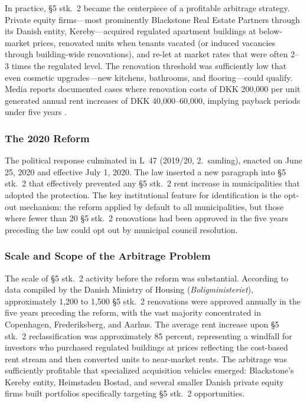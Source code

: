 \documentclass[12pt]{article}
\begin{document}
In practice, \S5 stk.\ 2 became the centerpiece of a profitable arbitrage strategy. Private equity firms---most prominently Blackstone Real Estate Partners through its Danish entity, Kereby---acquired regulated apartment buildings at below-market prices, renovated units when tenants vacated (or induced vacancies through building-wide renovations), and re-let at market rates that were often 2--3 times the regulated level. The renovation threshold was sufficiently low that even cosmetic upgrades---new kitchens, bathrooms, and flooring---could qualify. Media reports documented cases where renovation costs of DKK 200,000 per unit generated annual rent increases of DKK 40,000--60,000, implying payback periods under five years \citep{blackstone2019}.

\subsubsection*{The 2020 Reform} The political response culminated in L~47 (2019/20, 2.\ samling), enacted on June 25, 2020 and effective July 1, 2020. The law inserted a new paragraph into \S5 stk.\ 2 that effectively prevented any \S5 stk.\ 2 rent increase in municipalities that adopted the protection. The key institutional feature for identification is the opt-out mechanism: the reform applied by default to all municipalities, but those where fewer than 20 \S5 stk.\ 2 renovations had been approved in the five years preceding the law could opt out by municipal council resolution.

\subsubsection*{Scale and Scope of the Arbitrage Problem} The scale of \S5 stk.\ 2 activity before the reform was substantial. According to data compiled by the Danish Ministry of Housing (\emph{Boligministeriet}), approximately 1,200 to 1,500 \S5 stk.\ 2 renovations were approved annually in the five years preceding the reform, with the vast majority concentrated in Copenhagen, Frederiksberg, and Aarhus. The average rent increase upon \S5 stk.\ 2 reclassification was approximately 85 percent, representing a windfall for investors who purchased regulated buildings at prices reflecting the cost-based rent stream and then converted units to near-market rents. The arbitrage was sufficiently profitable that specialized acquisition vehicles emerged: Blackstone's Kereby entity, Heimstaden Bostad, and several smaller Danish private equity firms built portfolios specifically targeting \S5 stk.\ 2 opportunities.
\end{document}

